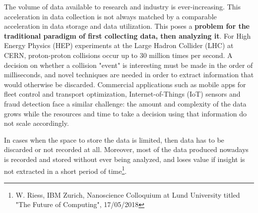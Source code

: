\vspace{-2mm}

The volume of data available to research and industry is ever-increasing. 
This acceleration in data collection is not always matched by a comparable acceleration in data storage and data utilization. 
This poses a \textbf{problem for the traditional paradigm of first collecting data, then analyzing it}. 
For High Energy Physics (HEP) experiments at the Large Hadron Collider (LHC) at CERN, proton-proton collisions occur up to 30 million times per second. A decision on whether a collision "event" is interesting must be made in the order of milliseconds, and novel techniques are needed in order to extract information that would otherwise be discarded. Commercial applications such as mobile apps for fleet control and transport optimization, Internet-of-Things (IoT) sensors and fraud detection face a similar challenge: the amount and complexity of the data grows while the resources and time to take a decision using that information do not scale accordingly.

In cases when the space to store the data is limited, then data has to be discarded or not recorded at all. 
Moreover, most of the data produced nowadays is recorded and stored without ever being analyzed, and loses value if insight is not extracted in a short period of time\footnote{W. Riess, IBM Zurich, Nanoscience Colloquium at Lund University titled "The Future of Computing", 17/05/2018}. 

